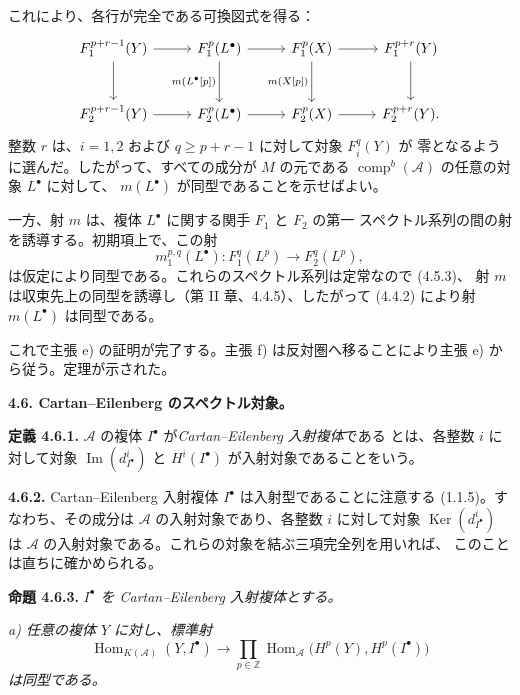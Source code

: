 \clearpage
{}%
\begingroup\small\setlength{\parskip}{0pt}\setlength{\emergencystretch}{1.5em}
\setlength{\abovedisplayskip}{4pt plus 2pt minus 2pt}%
\setlength{\belowdisplayskip}{4pt plus 2pt minus 2pt}%

これにより、各行が完全である可換図式を得る：
\[
\begin{tikzcd}[column sep=2.7em,row sep=2.8em]
F_1^{p+r-1}(Y) \arrow[r] \arrow[d] &
F_1^p(L^\bullet) \arrow[r] \arrow[d,"{m(L^\bullet[p])}"'] &
F_1^p(X) \arrow[r] \arrow[d,"{m(X[p])}"'] &
F_1^{p+r}(Y) \arrow[d] \\
F_2^{p+r-1}(Y) \arrow[r] &
F_2^p(L^\bullet) \arrow[r] &
F_2^p(X) \arrow[r] &
F_2^{p+r}(Y).
\end{tikzcd}
\]
整数 $r$ は、$i=1,2$ および $q\geq p+r-1$ に対して対象 $F_i^q(Y)$ が
零となるように選んだ。したがって、すべての成分が $M$ の元である
$\operatorname{comp}^{b}(\mathcal A)$ の任意の対象 $L^\bullet$ に対して、
$m(L^\bullet)$ が同型であることを示せばよい。

一方、射 $m$ は、複体 $L^\bullet$ に関する関手 $F_1$ と $F_2$ の第一
スペクトル系列の間の射を誘導する。初期項上で、この射
\[
m_1^{p,q}(L^\bullet)\colon F_1^q(L^p)\longrightarrow F_2^q(L^p),
\]
は仮定により同型である。これらのスペクトル系列は定常なので (4.5.3)、
射 $m$ は収束先上の同型を誘導し（第 II 章、4.4.5）、したがって (4.4.2)
により射 $m(L^\bullet)$ は同型である。

これで主張 e) の証明が完了する。主張 f) は反対圏へ移ることにより主張 e)
から従う。定理が示された。

\medskip\noindent\textbf{4.6. Cartan--Eilenberg のスペクトル対象。}

\noindent\textbf{定義 4.6.1.}\quad
$\mathcal A$ の複体 $I^\bullet$ が\emph{Cartan--Eilenberg 入射複体}である
とは、各整数 $i$ に対して対象 $\operatorname{Im}(d_{I^\bullet}^{i})$ と
$H^i(I^\bullet)$ が入射対象であることをいう。

\noindent\textbf{4.6.2.}\quad
Cartan--Eilenberg 入射複体 $I^\bullet$ は入射型であることに注意する
(1.1.5)。すなわち、その成分は $\mathcal A$ の入射対象であり、各整数
$i$ に対して対象 $\operatorname{Ker}(d_{I^\bullet}^{i})$ は
$\mathcal A$ の入射対象である。これらの対象を結ぶ三項完全列を用いれば、
このことは直ちに確かめられる。

\medskip\noindent\textbf{命題 4.6.3.}\quad
\textit{$I^\bullet$ を Cartan--Eilenberg 入射複体とする。}

\noindent\textit{a) 任意の複体 $Y$ に対し、標準射}
\[
\operatorname{Hom}_{K(\mathcal A)}(Y,I^\bullet)
\longrightarrow
\prod_{p\in\mathbb Z}
\operatorname{Hom}_{\mathcal A}\bigl(H^p(Y),H^p(I^\bullet)\bigr)
\]
\textit{は同型である。}
\endgroup
